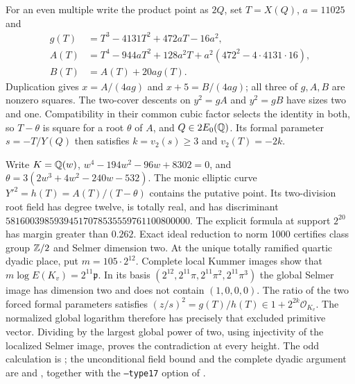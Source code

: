 For an even multiple write the product point as $2Q$, set $T=X(Q)$,
$a=11025$ and
\[
\begin{aligned}
 g(T)&=T^3-4131T^2+472aT-16a^2,\\
 A(T)&=T^4-944aT^2+128a^2T+a^2(472^2-4\cdot4131\cdot16),\\
 B(T)&=A(T)+20ag(T).
\end{aligned}
\]
Duplication gives $x=A/(4ag)$ and $x+5=B/(4ag)$; all three
of $g,A,B$ are nonzero squares. The two-cover descents on
$y^2=gA$ and $y^2=gB$ have sizes two and one. Compatibility
in their common cubic factor selects the identity in both, so
$T-\theta$ is square for a root $\theta$ of $A$, and
$Q\in2E_0(\mathbb Q)$. Its formal parameter $s=-T/Y(Q)$ then
satisfies $k=v_2(s)\geq3$ and $v_2(T)=-2k$.

Write $K=\mathbb Q(w)$,
$w^4-194w^2-96w+8302=0$, and
$\theta=3(2w^3+4w^2-240w-532)$. The monic elliptic curve
$Y'^2=h(T)=A(T)/(T-\theta)$ contains the putative point.
Its two-division root field has degree twelve, is totally real,
and has discriminant $58160039859394517078535559761100800000$.
The explicit formula at support $2^{20}$ has margin greater than
$0.262$. Exact ideal reduction to norm 1000 certifies class group
$\mathbb Z/2$ and Selmer dimension two.
At the unique totally ramified quartic dyadic place, put
$m=105\cdot2^{12}$. Complete local Kummer images show that
$m\log E(K_v)=2^{11}\mathfrak p$. In its basis
$(2^{12},2^{11}\pi,2^{11}\pi^2,2^{11}\pi^3)$ the global Selmer
image has dimension two and does not contain $(1,0,0,0)$.
The ratio of the two forced formal parameters satisfies
$(z/s)^2=g(T)/h(T)\in1+2^{2k}\mathcal O_{K_v}$.
The normalized global logarithm therefore has precisely that excluded
primitive vector. Dividing by the largest global power of two,
using injectivity of the localized Selmer image, proves the
contradiction at every height.
The odd calculation is ; the
unconditional field bound and the complete dyadic argument are
 and
, together with the
\texttt{--type17} option of .
